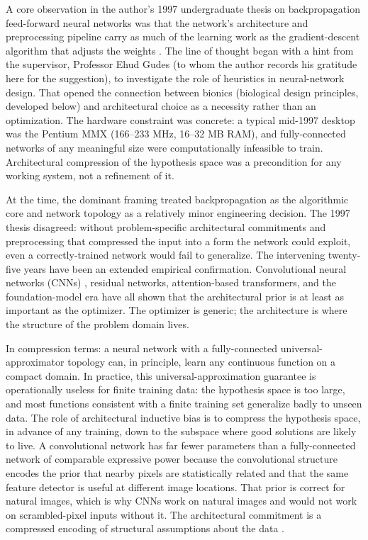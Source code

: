 \documentclass[11pt]{article}
\begin{document}
A core observation in the author's 1997 undergraduate thesis on backpropagation feed-forward neural networks was that the network's architecture and preprocessing pipeline carry as much of the learning work as the gradient-descent algorithm that adjusts the weights \citep{gavrilov_1997}. The line of thought began with a hint from the supervisor, Professor Ehud Gudes (to whom the author records his gratitude here for the suggestion), to investigate the role of heuristics in neural-network design. That opened the connection between bionics (biological design principles, developed below) and architectural choice as a necessity rather than an optimization. The hardware constraint was concrete: a typical mid-1997 desktop was the Pentium MMX (166--233 MHz, 16--32 MB RAM), and fully-connected networks of any meaningful size were computationally infeasible to train. Architectural compression of the hypothesis space was a precondition for any working system, not a refinement of it.

At the time, the dominant framing treated backpropagation \citep{rumelhart1986} as the algorithmic core and network topology as a relatively minor engineering decision. The 1997 thesis disagreed: without problem-specific architectural commitments and preprocessing that compressed the input into a form the network could exploit, even a correctly-trained network would fail to generalize. The intervening twenty-five years have been an extended empirical confirmation. Convolutional neural networks (CNNs) \citep{lecun1989}, residual networks, attention-based transformers, and the foundation-model era have all shown that the architectural prior is at least as important as the optimizer. The optimizer is generic; the architecture is where the structure of the problem domain lives.

In compression terms: a neural network with a fully-connected universal-approximator topology can, in principle, learn any continuous function on a compact domain. In practice, this universal-approximation guarantee is operationally useless for finite training data: the hypothesis space is too large, and most functions consistent with a finite training set generalize badly to unseen data. The role of architectural inductive bias is to compress the hypothesis space, in advance of any training, down to the subspace where good solutions are likely to live. A convolutional network has far fewer parameters than a fully-connected network of comparable expressive power because the convolutional structure encodes the prior that nearby pixels are statistically related and that the same feature detector is useful at different image locations. That prior is correct for natural images, which is why CNNs work on natural images and would not work on scrambled-pixel inputs without it. The architectural commitment is a compressed encoding of structural assumptions about the data \citep{russell_norvig_1995, bigus1998}.
\end{document}
